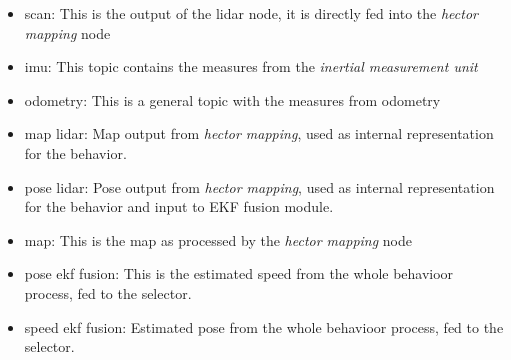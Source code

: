 \begin{itemize}
  \item scan: This is the output of the lidar node, it is directly fed into the \textit{hector mapping} node
  \item imu: This topic contains the measures from the \textit{inertial measurement unit}
  \item odometry: This is a general topic with the measures from odometry
  \item map lidar: Map output from \textit{hector mapping}, used as internal representation for the behavior.
  \item pose lidar: Pose output from \textit{hector mapping}, used as internal representation for the behavior and input to EKF fusion module.
  \item map: This is the map as processed by the \textit{hector mapping} node
  \item pose ekf fusion: This is the estimated speed from the whole behavioor process, fed to the selector.
  \item speed ekf fusion: Estimated pose from the whole behavioor process, fed to the selector.
\end{itemize}
